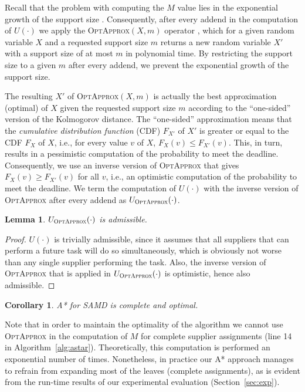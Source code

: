 \documentclass[letterpaper]{article}
\newtheorem{corollary}{Corollary}
\newtheorem{lemma}{Lemma}
\newcommand{\samd}{\ac{SAMD}\xspace}
\newcommand{\astar}{\textsc{A*}\xspace}
\newcommand{\optapprox}{\textsc{OptApprox}\xspace}
\begin{document}
Recall that the problem with computing the $M$ value lies in the exponential growth of the support size \cite{cohen2015estimating}. Consequently, after every addend in the computation of $U(\cdot)$ we apply the \optapprox$(X,m)$ operator \cite{cohen2018optimal}, which for a given random variable $X$ and a requested support size $m$ returns a new random variable $X'$ with a support size of at most $m$ in polynomial time. By restricting the support size to a given $m$ after every addend, we prevent the exponential growth of the support size.

The resulting $X'$ of \optapprox$(X,m)$ is actually the best approximation (optimal) of $X$ given the requested support size $m$ according to the ``one-sided'' version of the Kolmogorov distance. The ``one-sided'' approximation means that the \emph{cumulative distribution function} (CDF) $F_{X'}$ of $X'$ is greater or equal to the CDF $F_{X}$ of $X$, i.e., for every value $v$ of $X$, $F_{X}(v)\leq F_{X'}(v)$. This, in turn, results in a pessimistic computation of the probability to meet the deadline. Consequently, we use an inverse version of \optapprox that gives $F_{X}(v)\geq F_{X'}(v)$ for all $v$, i.e., an optimistic computation of the probability to meet the deadline. We term the computation of $U(\cdot)$ with the inverse version of \optapprox after every addend as $U_{\optapprox}(\cdot)$.

\begin{lemma}
$U_{\optapprox}(\cdot)$ is admissible.
\label{lem:admissible}
\end{lemma}

\begin{proof}
$U(\cdot)$ is trivially admissible, since it assumes that all suppliers that can perform a future task will do so simultaneously, which is obviously not worse than any single supplier performing the task. Also, the inverse version of \optapprox that is applied in $U_{\optapprox}(\cdot)$ is optimistic, hence also admissible.
\end{proof}

\begin{corollary}
\astar for \samd is complete and optimal.
\end{corollary}

Note that in order to maintain the optimality of the algorithm we cannot use \optapprox in the computation of $M$ for complete supplier assignments (line 14 in Algorithm~\ref{alg:astar}). Theoretically, this computation is performed an exponential number of times. Nonetheless, in practice our \astar approach manages to refrain from expanding most of the leaves (complete assignments), as is evident from the run-time results of our experimental evaluation (Section~\ref{sec:exp}).
\end{document}
